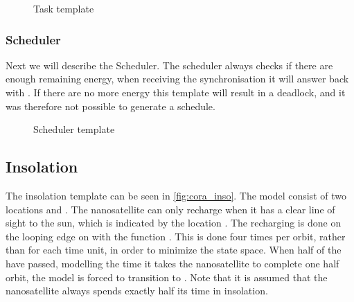 \begin{figure}[h]
	\caption{Task template}
	\label{fig:cora_pro}
\end{figure}



\subsubsection*{Scheduler}\label{ssec:cora_sch}
Next we will describe the Scheduler. The scheduler always checks if there are enough remaining energy, when receiving the synchronisation  it will answer back with . If there are no more energy this template will result in a deadlock, and it was therefore not possible to generate a schedule.

\begin{figure}[H]
	\centering
	\caption{Scheduler template}
	\label{fig:cora_schedule}
\end{figure}


\subsection*{Insolation} \label{ssec:cora_ins}
The insolation template can be seen in \cref{fig:cora_inso}. The model consist of two locations  and . The nanosatellite can only recharge when it has a clear line of sight to the sun, which is indicated by the location . The recharging is done on the looping edge on  with the function . This is done four times per orbit, rather than for each time unit, in order to minimize the state space. When half of the  have passed, modelling the time it takes the nanosatellite to complete one half orbit, the model is forced to transition to . Note that it is assumed that the nanosatellite always spends exactly half its time in insolation.

